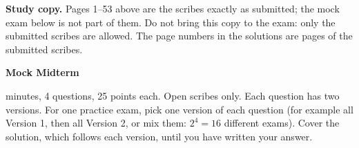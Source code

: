 
\clearpage
\noindent\textbf{Study copy.} Pages 1--53 above are the scribes exactly as submitted; the mock
exam below is not part of them. Do not bring this copy to the exam: only the submitted scribes are
allowed. The page numbers in the solutions are pages of the submitted scribes.
\vspace{0.2in}

\noindent\textbf{\large Mock Midterm}

\vspace{0.1in}

 minutes, 4 questions, 25 points each. Open scribes only. Each question has two
versions. For one practice exam, pick one version of each question (for example all Version 1,
then all Version 2, or mix them: $2^4 = 16$ different exams). Cover the solution, which follows
each version, until you have written your answer.
\vspace{0.1in}


